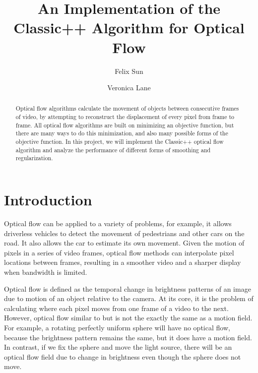 \documentclass[10pt,twocolumn,letterpaper]{article}
\begin{document}
\title{An Implementation of the Classic++ Algorithm for Optical Flow}

\author{Felix Sun
\and
Veronica Lane
}

\maketitle
\begin{abstract}
Optical flow algorithms calculate the movement of objects between consecutive frames of video, by attempting to reconstruct the displacement of every pixel from frame to frame. All optical flow algorithms are built on minimizing an objective function, but there are many ways to do this minimization, and also many possible forms of the objective function. In this project, we will implement the Classic++ optical flow algorithm and analyze the performance of different forms of smoothing and regularization.
\end{abstract}


\section{Introduction}

Optical flow can be applied to a variety of problems, for example, it allows driverless vehicles to detect the movement of pedestrians and other cars on the road. It also allows the car to estimate its own movement. Given the motion of pixels in a series of video frames, optical flow methods can interpolate pixel locations between frames, resulting in a smoother video and a sharper display when bandwidth is limited.

Optical flow is defined as the temporal change in brightness patterns of an image due to motion of an object relative to the camera. At its core, it is the problem of calculating where each pixel moves from one frame of a video to the next. \cite{fleet} However, optical flow similar to but is not the exactly the same as a motion field. For example, a rotating perfectly uniform sphere will have no optical flow, because the brightness pattern remains the same, but it does have a motion field. In contrast, if we fix the sphere and move the light source, there will be an optical flow field due to change in brightness even though the sphere does not move.
\end{document}
